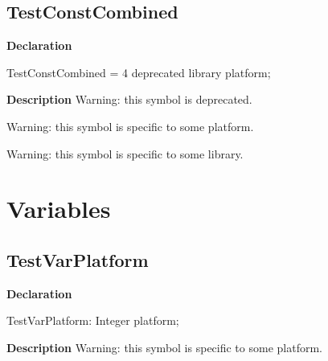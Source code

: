 \documentclass{report}
\begin{document}
\subsection*{TestConstCombined}
\begin{list}{}{
\setlength{\itemindent}{0cm}
\setlength{\listparindent}{0cm}
\setlength{\leftmargin}{\evensidemargin}
\addtolength{\leftmargin}{\tmplength}
\settowidth{\labelsep}{X}
\addtolength{\leftmargin}{\labelsep}
\setlength{\labelwidth}{\tmplength}
}
\begin{flushleft}
\item[\textbf{Declaration}\hfill]
\begin{ttfamily}
TestConstCombined = 4 deprecated library platform;\end{ttfamily}


\end{flushleft}
\par
\item[\textbf{Description}]
Warning: this symbol is deprecated.

Warning: this symbol is specific to some platform.

Warning: this symbol is specific to some library.

 

\end{list}
\section{Variables}
\subsection*{TestVarPlatform}
\begin{list}{}{
\setlength{\itemindent}{0cm}
\setlength{\listparindent}{0cm}
\setlength{\leftmargin}{\evensidemargin}
\addtolength{\leftmargin}{\tmplength}
\settowidth{\labelsep}{X}
\addtolength{\leftmargin}{\labelsep}
\setlength{\labelwidth}{\tmplength}
}
\begin{flushleft}
\item[\textbf{Declaration}\hfill]
\begin{ttfamily}
TestVarPlatform: Integer platform;\end{ttfamily}


\end{flushleft}
\par
\item[\textbf{Description}]
Warning: this symbol is specific to some platform.

 

\end{list}
\end{document}
